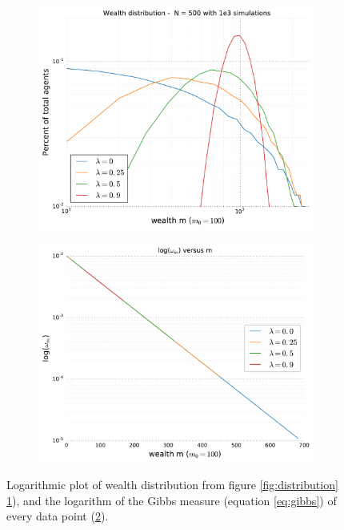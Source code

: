 \documentclass[10pt, a4paper]{amsart}
\begin{document}
\begin{figure}
\begin{subfigure}{.5\textwidth}
  \centering
  \includegraphics[width=\textwidth]{../figures/5ac/5cLOGLOG_N500_varSavings.pdf}
  \caption{}
  \label{fig:logdistribution}
\end{subfigure}%
\begin{subfigure}{.5\textwidth}
  \centering
  \includegraphics[width=\linewidth]{../figures/5ac/omega.pdf}
  \caption{}
  \label{fig:straightline}
\end{subfigure}
\caption{Logarithmic plot of wealth distribution from figure \ref{fig:distribution} \ref{fig:logdistribution}), and the logarithm of the Gibbs measure (equation \ref{eq:gibbs}) of every data point (\ref{fig:straightline}).}
\label{fig:logplot}
\end{figure}
\end{document}
